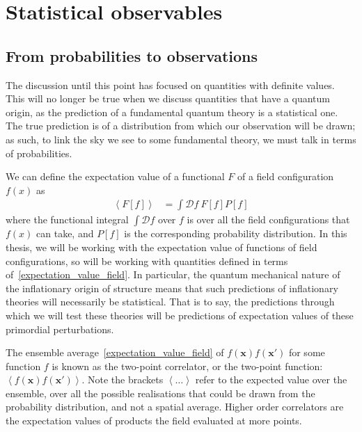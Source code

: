 \section{Statistical observables}
\subsection{From probabilities to observations}\label{corr_functions}
    The discussion until this point has focused on quantities
    with definite values. This will no longer
    be true when we discuss quantities that have a quantum origin, as
    the prediction of a fundamental quantum theory is a statistical one.
    The true prediction is of a distribution from which our observation will be drawn;
    as such, to link the sky we see to some fundamental theory,
    we must talk in terms of probabilities.


    We can define the expectation value of a functional $F$ of a field configuration $f(x)$ as
    \begin{align}
        \left<F\left[f\right]\right> &= \int \mathcal{D}f~F\left[f\right] P\left[f\right]\label{expectation_value_field}
    \end{align}
    where the functional integral $\int \mathcal{D}f$ over $f$ is over all the field configurations
    that $f(x)$ can take, and $P\left[f\right]$ is the corresponding probability distribution.
    In this thesis, we will be working with the expectation value of
    functions of field configurations, so will be working with quantities
    defined in terms of~\eqref{expectation_value_field}.
    In particular, the quantum mechanical nature of the inflationary
    origin of structure means that such predictions
    of inflationary theories will necessarily be statistical. That is to say, the predictions through
    which we will test these theories will be predictions of expectation
    values of these primordial perturbations.


    The ensemble average~\eqref{expectation_value_field} of
    $f(\mathbf{x})f(\mathbf{x'})$ for some function $f$ is known as the
    two-point correlator, or the two-point function: $\left<f(\mathbf{x})f(\mathbf{x'})\right>$.
    Note the brackets $\left<\ldots\right>$ refer to the expected value over the ensemble,
    over all the possible realisations that could be drawn from the probability
    distribution, and not a spatial average.
    Higher order correlators are the
    expectation values of products the field evaluated at more points.


